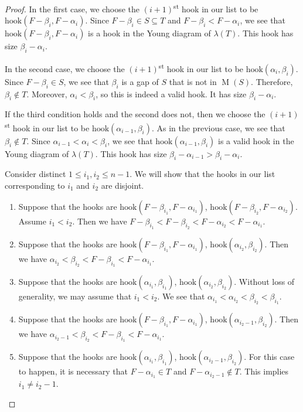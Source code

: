 \documentclass{amsproc}
\DeclareMathOperator{\M}{M}
\newcommand{\hook}{\text{hook}}
\theoremstyle{definition}
\theoremstyle{remark}
\numberwithin{equation}{section}
\begin{document}
\begin{proof}
In the first case, we choose the $(i+1)$\textsuperscript{st} hook in our list to be $\hook(F-\beta_{i},F-\alpha_i)$. Since $F-\beta_i\in S\subseteq T$ and $F-\beta_i<F-\alpha_i$, we see that $\hook(F-\beta_{i},F-\alpha_i)$ is a hook in the Young diagram of $\lambda(T)$. This hook has size $\beta_i-\alpha_i$.

In the second case, we choose the $(i+1)$\textsuperscript{st} hook in our list to be $\hook(\alpha_i,\beta_i)$. Since $F-\beta_i \in S$, we see that $\beta_i$ is a gap of $S$ that is not in $\M(S)$.  Therefore, $\beta_i \not\in T$.
Moreover, $\alpha_i<\beta_i$, so this is indeed a valid hook. It has size $\beta_i-\alpha_i$.

If the third condition holds and the second does not, then we choose the $(i+1)$\textsuperscript{st} hook in our list to be $\hook(\alpha_{i-1},\beta_i)$. As in the previous case, we see that $\beta_i \not\in T$. 
Since $\alpha_{i-1}<\alpha_i<\beta_i$, we see that $\hook(\alpha_{i-1},\beta_i)$ is a valid hook in the Young diagram of $\lambda(T)$. This hook has size $\beta_i-\alpha_{i-1}>\beta_i-\alpha_i$.


Consider distinct $1\leq i_1,i_2\leq n-1$. We will show that the hooks in our list corresponding to $i_1$ and $i_2$ are disjoint.
\begin{enumerate}
    \item Suppose that the hooks are $\hook(F-\beta_{i_1},F-\alpha_{i_1})$, $\hook(F-\beta_{i_2},F-\alpha_{i_2})$. Assume $i_1<i_2$. Then we have $F-\beta_{i_1}<F-\beta_{i_2}<F-\alpha_{i_2}<F-\alpha_{i_1}$.
    \item Suppose that the hooks are $\hook(F-\beta_{i_1},F-\alpha_{i_1})$, $\hook(\alpha_{i_2},\beta_{i_2})$. Then we have $\alpha_{i_2}<\beta_{i_2}< F-\beta_{i_1}<F-\alpha_{i_1}$.
    \item Suppose that the hooks are $\hook(\alpha_{i_1},\beta_{i_1})$, $\hook(\alpha_{i_2},\beta_{i_2})$. Without loss of generality, we may assume that $i_1<i_2$. We see that $\alpha_{i_1}<\alpha_{i_2}<\beta_{i_2}<\beta_{i_1}$.
    \item Suppose that the hooks are $\hook(F-\beta_{i_1},F-\alpha_{i_1})$, $\hook(\alpha_{i_2-1},\beta_{i_2})$.
    Then we have $\alpha_{i_2-1}<\beta_{i_2}< F-\beta_{i_1}<F-\alpha_{i_1}$.
    \item Suppose that the hooks are $\hook(\alpha_{i_1},\beta_{i_1})$, $\hook(\alpha_{i_2-1},\beta_{i_2})$.
    For this case to happen, it is necessary that $F-\alpha_{i_1}\in T$ and $F-\alpha_{i_2-1}\notin T$.  This implies $i_1\neq i_2-1$.
    

\end{enumerate}
\end{proof}
\end{document}
